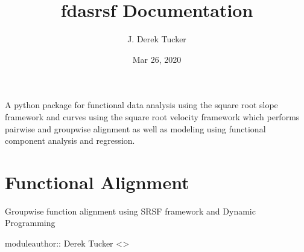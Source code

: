 \documentclass[letterpaper,10pt,english]{sphinxmanual}
\title{fdasrsf Documentation}
\date{Mar 26, 2020}
\author{J. Derek Tucker}
\begin{document}
\pagestyle{empty}
\sphinxmaketitle
\pagestyle{plain}
\sphinxtableofcontents
\pagestyle{normal}
\label{\detokenize{index::doc}}


A python package for functional data analysis using the square root
slope framework and curves using the square root velocity framework
which performs pair\sphinxhyphen{}wise and group\sphinxhyphen{}wise alignment as well as modeling
using functional component analysis and regression.


\chapter{Functional Alignment}
\label{\detokenize{time_warping:module-time_warping}}\label{\detokenize{time_warping:functional-alignment}}\label{\detokenize{time_warping::doc}}
Group\sphinxhyphen{}wise function alignment using SRSF framework and Dynamic Programming

moduleauthor:: Derek Tucker \textless{}\textgreater{}
\end{document}
